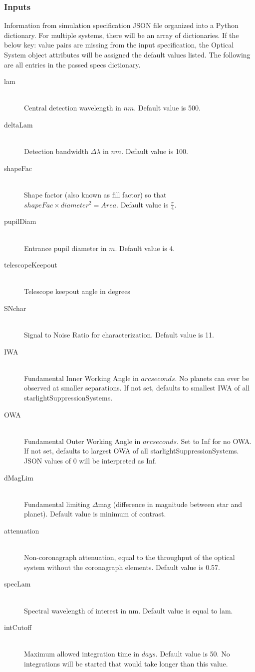 \documentclass[cleanfoot]{asme2ej}
\begin{document}
\subsubsection*{Inputs}
Information from simulation specification JSON file organized into a Python dictionary.  For multiple systems, there will be an array of dictionaries. If the below key: value pairs are missing from the input specification, the Optical System object attributes will be assigned the default values listed. The following are all entries in the passed specs dictionary.

\begin{description}
    \item[lam] \hfill \\
    Central detection wavelength in $ nm $. Default value is 500.
    \item[deltaLam] \hfill \\
    Detection bandwidth $ \Delta\lambda $ in $ nm $. Default value is 100.
    \item[shapeFac] \hfill \\
    Shape factor (also known as fill factor) so that $ shapeFac \times diameter^2 = Area $. Default value is $ \frac{\pi}{4} $.
    \item[pupilDiam] \hfill \\
    Entrance pupil diameter in  $ m $. Default value is $ 4$.
    \item[telescopeKeepout] \hfill \\
        Telescope keepout angle in degrees
    \item[SNchar] \hfill \\
    Signal to Noise Ratio for characterization. Default value is 11.
    \item[IWA] \hfill \\
    Fundamental Inner Working Angle in $ arcseconds $. No planets can ever be observed at smaller separations. If not set, defaults to smallest IWA of all starlightSuppressionSystems.
    \item[OWA] \hfill \\
    Fundamental Outer Working Angle in $ arcseconds $. Set to Inf for no OWA. If not set, defaults to largest OWA of all starlightSuppressionSystems.  JSON values of 0 will be interpreted as Inf.
    \item[dMagLim] \hfill \\
    Fundamental limiting $ \Delta$mag (difference in magnitude between star and planet). Default value is minimum of contrast.
    \item[attenuation] \hfill \\
    Non-coronagraph attenuation, equal to the throughput of the optical system without the coronagraph elements. Default value is 0.57.
    \item[specLam] \hfill \\
    Spectral wavelength of interest in nm. Default value is equal to lam.
    \item[intCutoff] \hfill \\
    Maximum allowed integration time in $ days $. Default value is 50. No integrations will be started that would take longer than this value.
 

\end{description}
\end{document}
